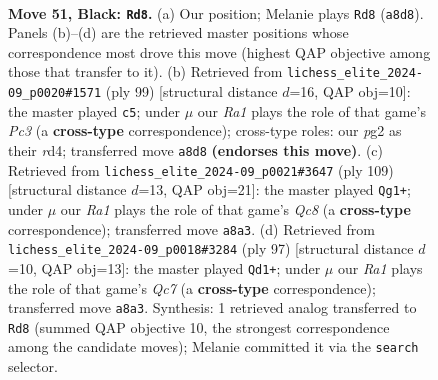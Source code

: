 \documentclass[11pt]{article}
\begin{document}
\clearpage

\begin{figure}[p]\centering
\begin{subfigure}{0.46\textwidth}\centering
\resizebox{\linewidth}{!}{%
\newchessgame
\chessboard[
  setfen={r7/1p6/4k3/1Q6/4P3/8/6PP/1K6 b - - 2 51},
  showmover=false,
  pgfstyle=straightmove, color=movearrow, markmove={a8-d8}
]}
\caption{}
\end{subfigure}\hfill
\begin{subfigure}{0.46\textwidth}\centering
\resizebox{\linewidth}{!}{%
\newchessgame
\chessboard[
  setfen={1Q6/p7/2p5/k6K/3R4/1P6/8/8 b - - 0 50},
  showmover=false,
  pgfstyle=straightmove, color=movearrow, markmove={c6-c5}
]}
\caption{}
\end{subfigure}
\\[4pt]
\begin{subfigure}{0.46\textwidth}\centering
\resizebox{\linewidth}{!}{%
\newchessgame
\chessboard[
  setfen={8/6k1/4p3/8/3PQ1K1/8/5P2/2q5 b - - 7 55},
  showmover=false,
  pgfstyle=straightmove, color=movearrow, markmove={c1-g1}
]}
\caption{}
\end{subfigure}\hfill
\begin{subfigure}{0.46\textwidth}\centering
\resizebox{\linewidth}{!}{%
\newchessgame
\chessboard[
  setfen={3k4/1P6/4Q3/8/8/4p1PP/2q5/6K1 b - - 2 49},
  showmover=false,
  pgfstyle=straightmove, color=movearrow, markmove={c2-d1}
]}
\caption{}
\end{subfigure}
\caption{\textbf{Move 51, Black: \texttt{Rd8}.} (a) Our position; Melanie plays \texttt{Rd8} (\texttt{a8d8}). Panels (b)--(d) are the retrieved master positions whose correspondence most drove this move (highest QAP objective among those that transfer to it). (b) Retrieved from \texttt{lichess\_elite\_2024-09\_p0020\#1571} (ply 99) [structural distance $d$=16, QAP obj=10]: the master played \texttt{c5}; under $\mu$ our \emph{Ra1} plays the role of that game's \emph{Pc3} (a \textbf{cross-type} correspondence); cross-type roles: our \emph{p}g2 as their \emph{r}d4; transferred move \texttt{a8d8} \textbf{(endorses this move)}. (c) Retrieved from \texttt{lichess\_elite\_2024-09\_p0021\#3647} (ply 109) [structural distance $d$=13, QAP obj=21]: the master played \texttt{Qg1+}; under $\mu$ our \emph{Ra1} plays the role of that game's \emph{Qc8} (a \textbf{cross-type} correspondence); transferred move \texttt{a8a3}. (d) Retrieved from \texttt{lichess\_elite\_2024-09\_p0018\#3284} (ply 97) [structural distance $d$=10, QAP obj=13]: the master played \texttt{Qd1+}; under $\mu$ our \emph{Ra1} plays the role of that game's \emph{Qc7} (a \textbf{cross-type} correspondence); transferred move \texttt{a8a3}. Synthesis: 1 retrieved analog transferred to \texttt{Rd8} (summed QAP objective 10, the strongest correspondence among the candidate moves); Melanie committed it via the \texttt{search} selector.}
\label{fig:thought-m101}
\end{figure}
\end{document}
